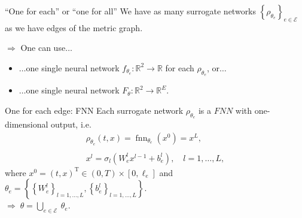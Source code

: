 \documentclass[9pt]{beamer}
\begin{document}
\begin{frame}{“One for each” or “one for all”}
    We have as many surrogate networks $\left\{ \rho_{\theta_e} \right\}_{e \in \mathcal{E}}$ as we have edges of the metric graph. \\
    
    
    \vspace{5mm}

    $\Rightarrow$ One can use$\ldots$
    \begin{itemize}
        \item $\ldots$one single neural network $f_{\theta_e} \colon \mathbb{R}^2 \to \mathbb{R}$ for each $\rho_{\theta_e}$, or$\ldots$
        \item $\ldots$one single neural network $F_{\theta} \colon \mathbb{R}^2 \to \mathbb{R}^E$.
    \end{itemize}
\end{frame}


\begin{frame}{One for each edge: FNN}
    Each surrogate network $\rho_{\theta_e}$ is a $FNN$ with one-dimensional output, i.e.  
    \begin{equation*} 
        \label{one_for_each}
        \begin{gathered}
            \rho_{\theta_e} \left(t, x \right) = \operatorname{fnn}_{\theta_e} \left( x^0 \right) = x^L, \\
            \\
            x^l = \sigma_l \left(W^l_e x^{l-1} + b^{l}_e\right), \quad l = 1, \ldots, L,
        \end{gathered} 
    \end{equation*} 
    where $x^0 = \left(t, x\right)^{\mathrm{T}} \in \left(0, T\right) \times \left[0, \ell_e\right]$ and $\theta_e = \left\{ \left\{ W^l_e \right\}_{l = 1, \ldots, L}, \left\{ b^l_e \right\}_{l = 1, \ldots, L} \right\}$. \\
    \vspace{3mm}
    $\Rightarrow \; \theta = \bigcup_{e \in \mathcal{E}} \ \theta_e$.
\end{frame}
\end{document}
